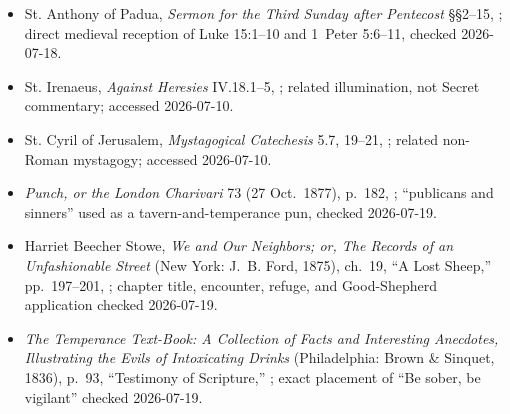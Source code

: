 {\begin{itemize}[itemsep=0em,topsep=0.15em,parsep=0pt]
\item St. Anthony of Padua, \emph{Sermon for the Third Sunday after Pentecost} §§2--15, ; direct medieval reception of Luke 15:1--10 and 1~Peter 5:6--11, checked 2026-07-18.
\item St. Irenaeus, \emph{Against Heresies} IV.18.1--5, ; related illumination, not Secret commentary; accessed 2026-07-10.
\item St. Cyril of Jerusalem, \emph{Mystagogical Catechesis} 5.7, 19--21, ; related non-Roman mystagogy; accessed 2026-07-10.
\item \emph{Punch, or the London Charivari} 73 (27 Oct.~1877), p.~182, ; ``publicans and sinners'' used as a tavern-and-temperance pun, checked 2026-07-19.
\item Harriet Beecher Stowe, \emph{We and Our Neighbors; or, The Records of an Unfashionable Street} (New York: J.~B. Ford, 1875), ch.~19, ``A Lost Sheep,'' pp.~197--201, ; chapter title, encounter, refuge, and Good-Shepherd application checked 2026-07-19.
\item \emph{The Temperance Text-Book: A Collection of Facts and Interesting Anecdotes, Illustrating the Evils of Intoxicating Drinks} (Philadelphia: Brown \& Sinquet, 1836), p.~93, ``Testimony of Scripture,'' ; exact placement of ``Be sober, be vigilant'' checked 2026-07-19.
\end{itemize}
}

